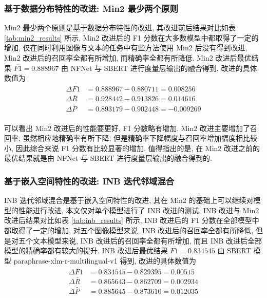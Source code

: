 \documentclass[12pt]{article}
\begin{document}
\subsubsection{基于数据分布特性的改进: Min2 最少两个原则}

Min2 最少两个原则是基于数据分布特性的改进, 其改进前后结果对比如表 \ref{tab:min2_results} 所示, Min2 改进后的 F1 分数在大多数模型中都取得了一定的增加, 仅在同时利用图像与文本的任务中有些方法使用 Min2 后没有得到改进, Min2 改进后的召回率全都有所增加, 而精确率全都有所降低. Min2 改进后最优结果 $\overline{F1}=0.888967$ 由 NFNet 与 SBERT 进行度量层输出的融合得到, 改进的具体数值为
\begin{equation}
  \begin{aligned}
    \Delta\overline{F1}&=0.888967-0.880711=0.008256\\
    \Delta\bar{R}&=0.928442-0.913826=0.014616\\
    \Delta\bar{P}&=0.893179-0.902448=-0.009269\\
  \end{aligned}
\end{equation}

可以看出 Min2 改进后的性能要更好, F1 分数略有增加, Min2 改进主要增加了召回率, 虽然相应地精确率有所下降, 但是精确率下降幅度与召回率增加幅度相比较小, 因此综合来说 F1 分数有比较显著的增加. 值得指出的是, 在 Min2 改进之前的最优结果就是由 NFNet 与 SBERT 进行度量层输出的融合得到的.

\subsubsection{基于嵌入空间特性的改进: INB 迭代邻域混合}

INB 迭代邻域混合是基于嵌入空间特性的改进, 其在 Min2 的基础上可以继续对模型的性能进行改进, 本文仅对单个模型进行了 INB 改进的测试. INB 改进与 Min2 改进后结果对比如表 \ref{tab:inb_results} 所示, INB 改进后的 F1 分数在全部模型中都取得了一定的增加, 对五个图像模型来说, INB 改进后的召回率全都有所降低, 但是对五个文本模型来说, INB 改进后的召回率全都有所增加, 而且 INB 改进后全部模型的精确率都有较大的提升. INB 改进后最优结果 $\overline{F1}=0.834545$ 由 SBERT 模型 paraphrase-xlm-r-multilingual-v1 得到, 改进的具体数值为
\begin{equation}
  \begin{aligned}
    \Delta\overline{F1}&=0.834545-0.829395=0.00515\\
    \Delta\bar{R}&=0.865643-0.862709=0.002934\\
    \Delta\bar{P}&=0.885645-0.873610=0.012035\\
  \end{aligned}
\end{equation}
\end{document}

